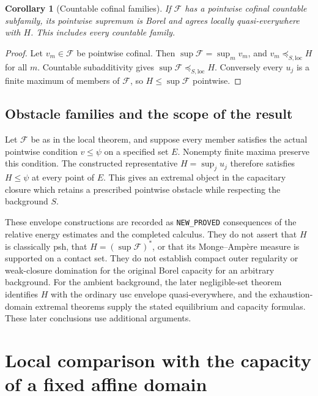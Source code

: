 \documentclass[11pt,a4paper]{article}
\numberwithin{equation}{section}
\newtheorem{corollary}[theorem]{Corollary}
\theoremstyle{definition}
\theoremstyle{remark}
\begin{document}
\begin{corollary}[Countable cofinal families]
If $\mathcal F$ has a pointwise cofinal countable subfamily, its
pointwise supremum is Borel and agrees locally quasi-everywhere
with $H$. This includes every countable family.
\end{corollary}

\begin{proof}
Let $v_m\in\mathcal F$ be pointwise cofinal. Then
$\sup\mathcal F=\sup_m v_m$, and $v_m\preceq_{S,\mathrm{loc}}H$
for all $m$. Countable subadditivity gives
$\sup\mathcal F\preceq_{S,\mathrm{loc}}H$. Conversely every
$u_j$ is a finite maximum of members of $\mathcal F$, so
$H\leq\sup\mathcal F$ pointwise.
\end{proof}

\subsection{Obstacle families and the scope of the result}

Let $\mathcal F$ be as in the local theorem, and suppose every
member satisfies the actual pointwise condition $v\leq\psi$
on a specified set $E$. Nonempty finite maxima preserve this
condition. The constructed representative $H=\sup_j u_j$
therefore satisfies $H\leq\psi$ at every point of $E$.
This gives an extremal object in the capacitary closure which
retains a prescribed pointwise obstacle while respecting the
background $S$.

These envelope constructions are recorded as \texttt{NEW\_PROVED}
consequences of the relative energy estimates and the completed
calculus. They do not assert that $H$ is classically psh, that
$H=(\sup\mathcal F)^*$, or that its Monge--Amp\`ere measure is
supported on a contact set. They do not establish compact outer
regularity or weak-closure domination for the original Borel
capacity for an arbitrary background. For the ambient background,
the later negligible-set theorem identifies $H$ with the ordinary
usc envelope quasi-everywhere, and the exhaustion-domain extremal
theorems supply the stated equilibrium and capacity formulas.
These later conclusions use additional arguments.



\section{Local comparison with the capacity of a fixed affine domain}
\label{sec:r2-domain-comparison}
\end{document}
